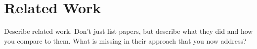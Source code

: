 \chapter{Related Work}

Describe related work.
Don't just list papers, but describe what they did and how you compare to them.
What is missing in their approach that you now address?
